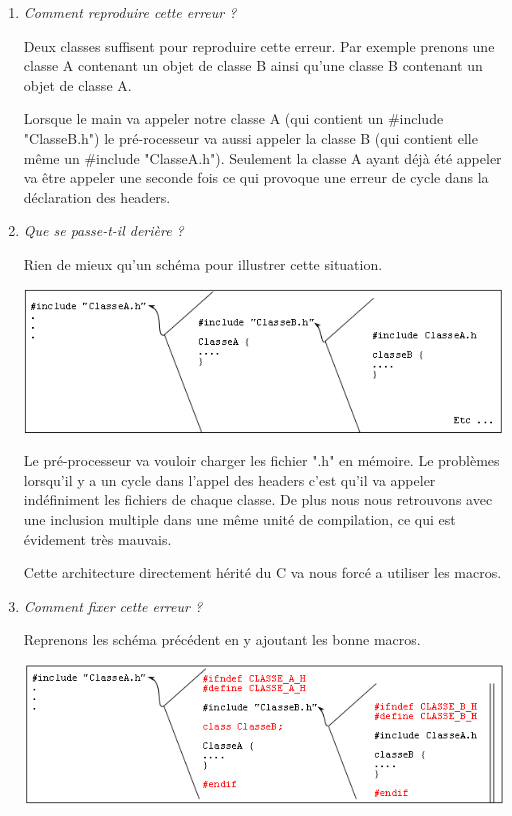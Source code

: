 \documentclass[a4paper,11pt]{article}
\begin{document}
\begin{enumerate}[label=-]
\item \textit{ Comment reproduire cette erreur ? }

Deux classes suffisent pour reproduire cette erreur. Par exemple prenons une classe A contenant un objet de classe B ainsi qu'une classe B contenant un objet de classe A. 

Lorsque le main va appeler notre classe A (qui contient un \#include "ClasseB.h") le pré-rocesseur va aussi appeler la classe B (qui contient elle même un \#include "ClasseA.h"). Seulement la classe A ayant déjà été appeler va être appeler une seconde fois ce qui provoque une erreur de cycle dans la déclaration des headers. 

\item \textit{ Que se passe-t-il derière ? }

Rien de mieux qu'un schéma pour illustrer cette situation.

\includegraphics[scale=0.565]{RuptureHeaderCycle.png} 

Le pré-processeur va vouloir charger les fichier ".h" en mémoire. Le problèmes lorsqu'il y a un cycle dans l'appel des headers c'est qu'il va appeler indéfiniment les fichiers de chaque classe. De plus nous nous retrouvons avec une inclusion multiple dans une même unité de compilation, ce qui est évidement très mauvais.

Cette architecture directement hérité du C va nous forcé a utiliser les macros.

\item \textit{ Comment fixer cette erreur ? }

Reprenons les schéma précédent en y ajoutant les bonne macros. 

\includegraphics[scale=0.565]{RuptureHeaderCycle2.png} 


\end{enumerate}
\end{document}

